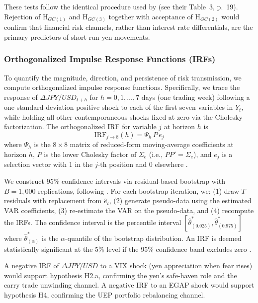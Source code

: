 \documentclass[12pt]{article}
\begin{document}
{} These tests follow the identical procedure used by \textcite{guyot2026risk} (see their Table~3, p.~19). Rejection of H$_{GC(1)}$ and H$_{GC(3)}$ together with acceptance of H$_{GC(2)}$ would confirm that financial risk channels, rather than interest rate differentials, are the primary predictors of short-run yen movements.

\subsubsection{Orthogonalized Impulse Response Functions (IRFs)}

{} To quantify the magnitude, direction, and persistence of risk transmission, we compute orthogonalized impulse response functions. Specifically, we trace the response of $\Delta JPY/USD_{t+h}$ for $h = 0, 1, \ldots, 7$ days (one trading week) following a one-standard-deviation positive shock to each of the first seven variables in $Y_t$, while holding all other contemporaneous shocks fixed at zero via the Cholesky factorization. The orthogonalized IRF for variable $j$ at horizon $h$ is
\begin{equation}
\text{IRF}_{j \rightarrow 8}(h) = \Psi_h \, P \, e_j
\end{equation}
where $\Psi_h$ is the $8 \times 8$ matrix of reduced-form moving-average coefficients at horizon $h$, $P$ is the lower Cholesky factor of $\Sigma_e$ (i.e., $PP' = \Sigma_e$), and $e_j$ is a selection vector with 1 in the $j$-th position and 0 elsewhere \parencite{luetkepohl2005new}.

{} We construct 95\% confidence intervals via residual-based bootstrap with $B = 1,000$ replications, following \textcite{guyot2026risk}. For each bootstrap iteration, we: (1) draw $T$ residuals with replacement from $\hat{e}_t$, (2) generate pseudo-data using the estimated VAR coefficients, (3) re-estimate the VAR on the pseudo-data, and (4) recompute the IRFs. The confidence interval is the percentile interval $[\hat{\theta}_{(0.025)}^*, \hat{\theta}_{(0.975)}^*]$ where $\hat{\theta}_{(\alpha)}^*$ is the $\alpha$-quantile of the bootstrap distribution. An IRF is deemed statistically significant at the 5\% level if the 95\% confidence band excludes zero \parencite{efron1994introduction}.

{} A negative IRF of $\Delta JPY/USD$ to a VIX shock (yen appreciation when fear rises) would support hypothesis H2.a, confirming the yen's safe-haven role and the carry trade unwinding channel. A negative IRF to an EGAP shock would support hypothesis H4, confirming the UEP portfolio rebalancing channel.
\end{document}
